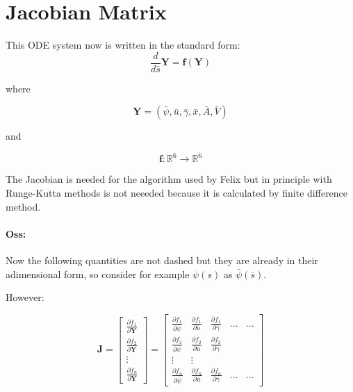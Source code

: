 \documentclass[12pt]{article}
\begin{document}
\paragraph{}


\appendix
\section{Jacobian Matrix}
This ODE system now is written in the standard form:
$$
\frac{d}{d\bar{s}} \mathbf{Y} = \mathbf{f} (\mathbf{Y})
$$

where 

$$
\mathbf{Y} = (\bar{\psi},\bar{u},\bar{\gamma},\bar{x},\bar{A},\bar{V})
$$

and 

$$
\mathbf{f}:\mathbb{R}^6 \to \mathbb{R}^6
$$


The Jacobian is needed for the algorithm used by Felix but in principle with Runge-Kutta methods is not neeeded because it is calculated by finite difference method.

\paragraph{Oss:} Now the following quantities are not dashed but they are already in their adimensional form, so consider for example $\psi(s)$ as $\bar{\psi}(\bar{s})$.

However:

$$
\mathbf{J} = \begin{bmatrix}
  \frac{\partial f_1}{\partial \mathbf{Y}} \\[1ex]
  \frac{\partial f_2}{\partial \mathbf{Y}} \\[1ex] 
  \vdots \\[1ex] 
  \frac{\partial f_n}{\partial \mathbf{Y}}
\end{bmatrix}=%
\begin{bmatrix}
    \frac{\partial f_1}{\partial \bar{\psi}} & 
      \frac{\partial f_1}{\partial \bar{u}} & 
      \frac{\partial f_1}{\partial \bar{\gamma}} & \dots & \dots \\[1ex] %
    \frac{\partial f_2}{\partial \bar{\psi}} & 
      \frac{\partial f_2}{\partial \bar{u}} & 
      \frac{\partial f_2}{\partial \bar{\gamma}} \\[1ex]

      \vdots & \vdots \\[1ex]
      \frac{\partial f_n}{\partial\bar{\psi}} & 
      \frac{\partial f_n}{\partial \bar{u}} & 
      \frac{\partial f_n}{\partial \bar{\gamma}}& \dots & \dots
  \end{bmatrix}
$$
\end{document}
